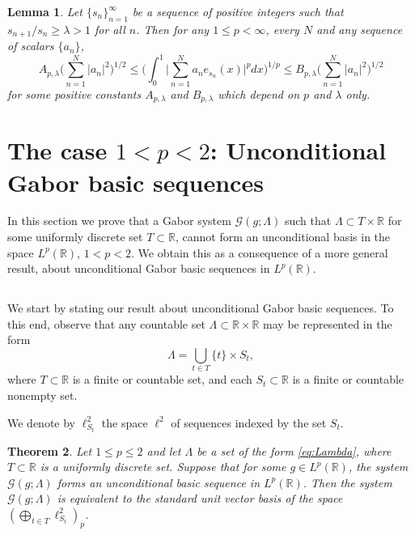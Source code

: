 \documentclass[reqno,a4paper,12pt]{amsart}
\numberwithin{equation}{section}
\numberwithin{figure}{section}
\newcommand\R{\mathbb{R}}
\newcommand\G{\mathcal{G}}
\newcommand\lam{\lambda}
\newcommand\1{\mathds{1}}
\newcommand{\TTT}{T}
\newcommand{\SSS}{S}
\renewcommand\le{\leqslant}
\renewcommand\ge{\geqslant}
\newcommand\sbt{\subset}
\theoremstyle{plain}
\newtheorem{thm}{Theorem}[section]
\newtheorem{lem}[thm]{Lemma}
\theoremstyle{definition}
\begin{document}
\begin{lem}
\label{lem:lacun}
Let $\{s_n\}_{n=1}^{\infty}$ be 
a sequence of positive integers such  that $s_{n+1}/s_n \ge \lambda > 1$ for all $n$. Then for any $1 \le p < \infty$, 
every $N$ and  any sequence of scalars $\{a_n\}$,
\begin{equation}
\label{eq:kh:lac}
A_{p,\lam} \Big( \sum_{n=1}^N |a_n|^2 \Big)^{1/2}\le \Big(
\int_{0}^{1}  \Big| \sum_{n=1}^N  a_n e_{s_n}(x)  \Big|^p dx \Big)^{1/p} \le B_{p, \lam} \Big( \sum_{n=1}^N |a_n|^2 \Big)^{1/2}
\end{equation}
for some positive constants $A_{p,\lam}$ and $B_{p, \lam}$ which depend on $p$ and $\lam$ only.
\end{lem}






\section{The case $1 <p < 2$: Unconditional Gabor basic sequences}
\label{sec:basesp<2}

In this section we prove that a Gabor system
$\G(g;\Lambda)$ such that 
$\Lambda\subset \TTT\times \R$ for some uniformly discrete set $\TTT\subset\R$,
cannot form an unconditional basis 
 in the space $L^p(\R)$, $1<p<2$.
We obtain this as a consequence of a more
general result, about unconditional Gabor basic sequences in
$L^p(\R)$.




\subsection{}
We start by stating our result about unconditional Gabor basic sequences.
 To this end, observe that
any countable set $\Lambda\subset \R\times\R$ may be represented in the form
\begin{equation}\label{eq:Lambda}
\Lambda=\bigcup_{t\in \TTT} \{t\}\times \SSS_t,
\end{equation}
where $\TTT \sbt \R$ is a finite or countable set, and each $\SSS_t\subset\R$ is a finite or countable nonempty set.

We denote by $\ell^2_{\SSS_t}$ the space $\ell^2$ of sequences indexed by the set $\SSS_t$. 


\begin{thm}
\label{thm:uncseq_p<2}
Let $1\le p \le 2$ and let $\Lambda$ be a set of the form \eqref{eq:Lambda}, where $\TTT \sbt \R$ is a uniformly discrete set. Suppose that for some $g\in L^p(\R)$, the system $\G(g;\Lambda)$ forms an unconditional basic sequence in $L^p(\R)$. Then the system $\G(g;\Lambda)$  is equivalent to the standard unit vector basis of the space $(\bigoplus_{t\in \TTT} \ell^2_{\SSS_t})_p$.
\end{thm}
\end{document}
